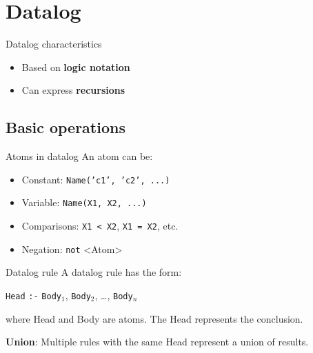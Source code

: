 \section{Datalog}

\begin{knBox}
    {Datalog characteristics}
    \begin{itemize}
        \item Based on \textbf{logic notation}
        \item Can express \textbf{recursions}
    \end{itemize}
\end{knBox}

\subsection{Basic operations}

\begin{definition}
    {Atoms in datalog}
    An atom can be:
    \begin{itemize}
        \item Constant: \texttt{Name('c1', 'c2', ...)}
        \item Variable: \texttt{Name(X1, X2, ...)}
        \item Comparisons: \texttt{X1 < X2}, \texttt{X1 = X2}, etc.
        \item Negation: \texttt{not} <Atom>
    \end{itemize}
\end{definition}

\begin{definition}
    {Datalog rule}
    A datalog rule has the form:
    \begin{center}
        \texttt{Head} \texttt{:-} \texttt{Body}\(_1\), \texttt{Body}\(_2\), \ldots, \texttt{Body}\(_n\)
    \end{center}
    where Head and Body are atoms. The Head represents the conclusion.

    \textbf{Union}: Multiple rules with the same Head represent a union of results.
\end{definition}


